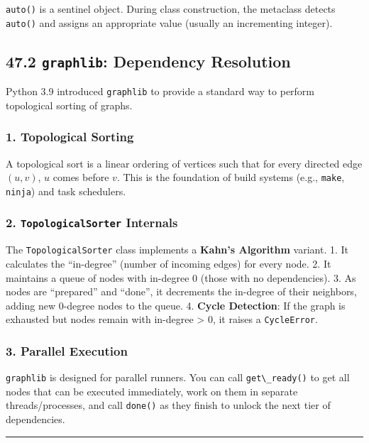 \passthrough{\lstinline!auto()!} is a sentinel object. During class
construction, the metaclass detects \passthrough{\lstinline!auto()!} and
assigns an appropriate value (usually an incrementing integer).

\hypertarget{graphlib-dependency-resolution}{%
\subsection{\texorpdfstring{47.2 \texttt{graphlib}: Dependency
Resolution}{47.2 graphlib: Dependency Resolution}}\label{graphlib-dependency-resolution}}

Python 3.9 introduced \passthrough{\lstinline!graphlib!} to provide a
standard way to perform topological sorting of graphs.

\hypertarget{topological-sorting}{%
\subsubsection{1. Topological Sorting}\label{topological-sorting}}

A topological sort is a linear ordering of vertices such that for every
directed edge \((u, v)\), \(u\) comes before \(v\). This is the
foundation of build systems (e.g., \passthrough{\lstinline!make!},
\passthrough{\lstinline!ninja!}) and task schedulers.

\hypertarget{topologicalsorter-internals}{%
\subsubsection{\texorpdfstring{2. \texttt{TopologicalSorter}
Internals}{2. TopologicalSorter Internals}}\label{topologicalsorter-internals}}

The \passthrough{\lstinline!TopologicalSorter!} class implements a
\textbf{Kahn's Algorithm} variant. 1. It calculates the ``in-degree''
(number of incoming edges) for every node. 2. It maintains a queue of
nodes with in-degree 0 (those with no dependencies). 3. As nodes are
``prepared'' and ``done'', it decrements the in-degree of their
neighbors, adding new 0-degree nodes to the queue. 4. \textbf{Cycle
Detection}: If the graph is exhausted but nodes remain with in-degree
\textgreater{} 0, it raises a \passthrough{\lstinline!CycleError!}.

\hypertarget{parallel-execution}{%
\subsubsection{3. Parallel Execution}\label{parallel-execution}}

\passthrough{\lstinline!graphlib!} is designed for parallel runners. You
can call \passthrough{\lstinline!get\_ready()!} to get all nodes that
can be executed immediately, work on them in separate threads/processes,
and call \passthrough{\lstinline!done()!} as they finish to unlock the
next tier of dependencies.

\begin{center}\rule{0.5\linewidth}{0.5pt}\end{center}
